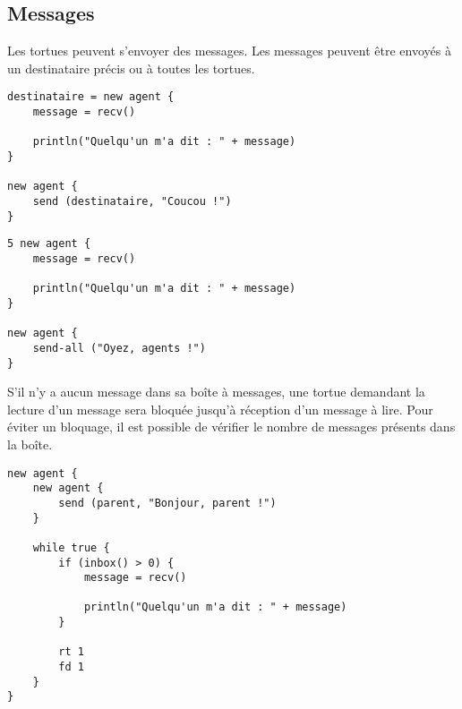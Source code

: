 \subsection{Messages}

Les tortues peuvent s'envoyer des messages. Les messages peuvent être envoyés à un destinataire précis ou à toutes les tortues.

\begin{verbatim}
destinataire = new agent {
    message = recv()

    println("Quelqu'un m'a dit : " + message)
}

new agent {
    send (destinataire, "Coucou !")
}
\end{verbatim}

\begin{verbatim}
5 new agent {
    message = recv()

    println("Quelqu'un m'a dit : " + message)
}

new agent {
    send-all ("Oyez, agents !")
}
\end{verbatim}

S'il n'y a aucun message dans sa boîte à messages, une tortue demandant la lecture d'un message sera bloquée jusqu'à réception d'un message à lire. Pour éviter un bloquage, il est possible de vérifier le nombre de messages présents dans la boîte.

\begin{verbatim}
new agent {
    new agent {
        send (parent, "Bonjour, parent !")
    }

    while true {
        if (inbox() > 0) {
            message = recv()

            println("Quelqu'un m'a dit : " + message)
        }

        rt 1
        fd 1
    }
}
\end{verbatim}


